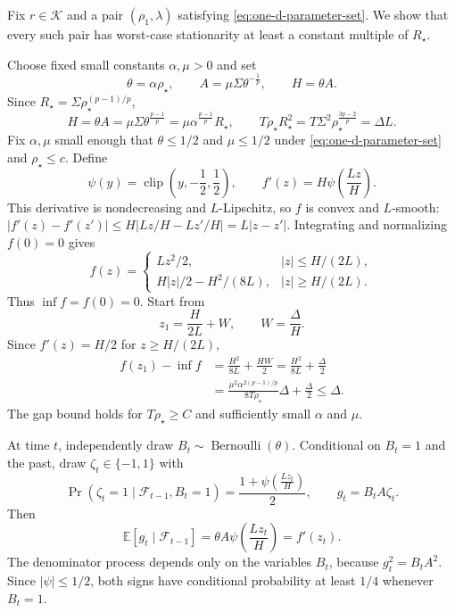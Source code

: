 \documentclass[11pt,letterpaper]{article}
\theoremstyle{definition}
\newcommand{\E}{\mathbb E}
\newcommand{\F}{\mathcal F}
\newcommand{\clip}{\operatorname{clip}}
\begin{document}
Fix $r\in\mathcal K$ and a pair $(\rho_1,\lambda)$ satisfying
\eqref{eq:one-d-parameter-set}. We show that every such pair has worst-case
stationarity at least a constant multiple of $R_\star$.

Choose fixed small constants $\alpha,\mu>0$ and set
\begin{equation}
\theta=\alpha\rho_\star,
\qquad
A=\mu\Sigma\theta^{-\frac{1}{p}},
\qquad
H=\theta A.
\label{eq:scalar-lower-scales}
\end{equation}
Since $R_\star=\Sigma\rho_\star^{(p-1)/p}$,
\[
H=\theta A=\mu\Sigma\theta^{\frac{p-1}{p}}
=\mu\alpha^{\frac{p-1}{p}}R_\star,\qquad
T\rho_\star R_\star^2
=T\Sigma^2\rho_\star^{\frac{3p-2}{p}}=\Delta L.
\]
Fix $\alpha,\mu$ small enough that $\theta\le1/2$ and $\mu\le1/2$
under \eqref{eq:one-d-parameter-set} and $\rho_\star\le c$.
Define
\begin{equation}
\psi(y)=\clip\left(y,-\frac{1}{2},\frac{1}{2}\right),
\qquad
f'(z)=H\psi\left(\frac{Lz}{H}\right).
\label{eq:scalar-lower-objective}
\end{equation}
This derivative is nondecreasing and $L$-Lipschitz, so $f$ is convex and
$L$-smooth: $|f'(z)-f'(z')|\le H|Lz/H-Lz'/H|=L|z-z'|$.
Integrating and normalizing $f(0)=0$ gives
\[
f(z)=\begin{cases}
Lz^2/2,& |z|\le H/(2L),\\
H|z|/2-H^2/(8L),& |z|\ge H/(2L).
\end{cases}
\]
Thus $\inf f=f(0)=0$. Start from
\begin{equation}
z_1=\frac{H}{2L}+W,
\qquad
W=\frac{\Delta}{H}.
\label{eq:scalar-start}
\end{equation}
Since $f'(z)=H/2$ for $z\ge H/(2L)$,
\begin{equation}
\begin{aligned}
f(z_1)-\inf f
&=\frac{H^2}{8L}+\frac{HW}{2}
=\frac{H^2}{8L}+\frac\Delta2\\
&=\frac{\mu^2\alpha^{2(p-1)/p}}{8T\rho_\star}\Delta
+\frac\Delta2\le\Delta.
\end{aligned}
\label{eq:scalar-gap-check}
\end{equation}
The gap bound holds for $T\rho_\star\ge C$ and sufficiently small
$\alpha$ and $\mu$.

At time $t$, independently draw
$B_t\sim\operatorname{Bernoulli}(\theta)$. Conditional on
$B_t=1$ and the past, draw $\zeta_t\in\{-1,1\}$ with
\begin{equation}
\Pr(\zeta_t=1\mid\F_{t-1},B_t=1)
=\frac{1+\psi\left(\frac{Lz_t}{H}\right)}2,
\qquad
g_t=B_tA \zeta_t.
\label{eq:signed-bernoulli-oracle}
\end{equation}
Then
\begin{equation}
\E[g_t\mid\F_{t-1}]
=\theta A\psi\left(\frac{Lz_t}{H}\right)
=f'(z_t).
\label{eq:scalar-oracle-unbiased}
\end{equation}
The denominator process depends only on the variables $B_t$, because
$g_t^2=B_tA^2$. Since $|\psi|\le1/2$, both signs have conditional
probability at least $1/4$ whenever $B_t=1$.
\end{document}
